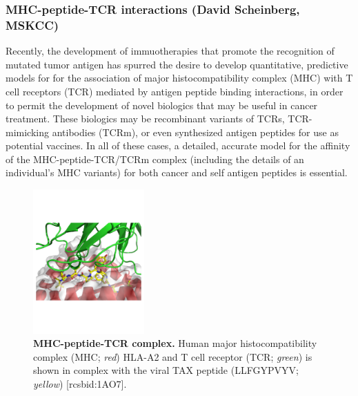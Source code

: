 \documentclass[10pt]{article}
\begin{document}
\vspace{-0.3cm}
\subsubsection*{MHC-peptide-TCR interactions (David Scheinberg, MSKCC)}
\vspace{-0.3cm}

Recently, the development of immuotherapies that promote the recognition of mutated tumor antigen has spurred the desire to develop quantitative, predictive models for for the association of major histocompatibility complex (MHC) with T cell receptors (TCR) mediated by antigen peptide binding interactions, in order to permit the development of novel biologics that may be useful in cancer treatment.
These biologics may be recombinant variants of TCRs, TCR-mimicking antibodies (TCRm), or even synthesized antigen peptides for use as potential vaccines.
In all of these cases, a detailed, accurate model for the affinity of the MHC-peptide-TCR/TCRm complex (including the details of an individual's MHC variants) for both cancer and self antigen peptides is essential.

\begin{figure}
\vspace{-2.6cm}
\includegraphics[width=0.38\textwidth]{figures/1AO7.pdf}
\vspace{-2.5cm}
\caption{\footnotesize \label{figure:mhc-peptide-tcr} {\bf MHC-peptide-TCR complex.}
Human major histocompatibility complex (MHC; \emph{red}) HLA-A2 and T cell receptor (TCR; \emph{green}) is shown in complex with the viral TAX peptide (LLFGYPVYV; \emph{yellow}) [rcsbid:1AO7].}
\end{figure}
\end{document}
